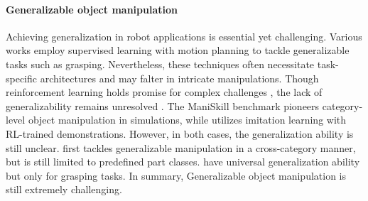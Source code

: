 \paragraph{Generalizable object manipulation} Achieving generalization in robot applications is essential yet challenging. Various works \citep{fang2020graspnet, sundermeyer2021contact, gou2021rgb, gao2021kpam, xu2021adagrasp} employ supervised learning with motion planning to tackle generalizable tasks such as grasping. Nevertheless, these techniques often necessitate task-specific architectures and may falter in intricate manipulations. Though reinforcement learning holds promise for complex challenges \citep{rajeswaran2017dapg, akkaya2019solving}, the lack of generalizability remains unresolved \citep{kirk2021generalization_survey,ghosh2021generalization}. The ManiSkill benchmark \citep{mu2021maniskill} pioneers category-level object manipulation in simulations, while \citep{shen2022learning} utilizes imitation learning with RL-trained demonstrations. However, in both cases, the generalization ability is still unclear.
\citep{geng2022gapartnet, geng2023partmanip} first tackles generalizable manipulation in a cross-category manner, but is still limited to predefined part classes. \citep{xu2023unidexgrasp, wan2023unidexgrasp++} have universal generalization ability but only for grasping tasks. In summary, Generalizable object manipulation is still extremely challenging.


